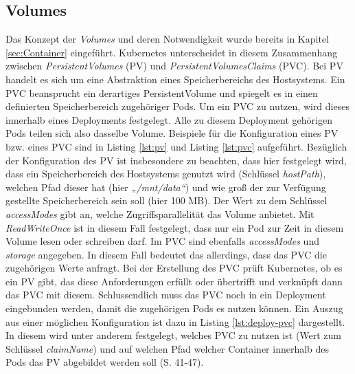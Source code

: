 \documentclass[11pt,a4paper]{article}
\begin{document}
\subsection{Volumes}
Das Konzept der \emph{Volumes} und deren Notwendigkeit wurde bereits in Kapitel \ref{sec:Container} eingeführt.
Kubernetes unterscheidet in diesem Zusammenhang zwischen \emph{PersistentVolumes} (PV) und \emph{PersistentVolumesClaims} (PVC).
Bei PV handelt es sich um eine Abstraktion eines Speicherbereichs des Hostsystems.
Ein PVC beansprucht ein derartiges PersistentVolume und spiegelt es in einen
definierten Speicherbereich zugehöriger Pods. Um ein PVC zu nutzen, wird dieses innerhalb eines Deployments festgelegt.
Alle zu diesem Deployment gehörigen Pods teilen sich also dasselbe Volume.
Beispiele für die Konfiguration eines PV bzw. eines PVC sind in Listing \ref{lst:pv} und Listing \ref{lst:pvc}
aufgeführt. Bezüglich der Konfiguration des PV ist insbesondere zu beachten, dass hier
festgelegt wird, dass ein Speicherbereich des Hostsystems genutzt wird (Schlüssel \emph{hostPath}),
welchen Pfad dieser hat (hier \emph{„/mnt/data“})
und wie groß der zur Verfügung gestellte Speicherbereich sein soll (hier 100 MB).
Der Wert zu dem Schlüssel \emph{accessModes} gibt an, welche Zugriffsparallelität das Volume anbietet.
Mit \emph{ReadWriteOnce} ist in diesem Fall festgelegt, dass nur ein Pod zur Zeit
in diesem Volume lesen oder schreiben darf.
Im PVC sind ebenfalls \emph{accessModes} und \emph{storage} angegeben. In diesem Fall
bedeutet das allerdings, dass das PVC die zugehörigen Werte anfragt.
Bei der Erstellung des PVC prüft Kubernetes, ob es ein PV gibt,
das diese Anforderungen erfüllt oder übertrifft und verknüpft dann das PVC mit diesem.
Schlussendlich muss das PVC noch in ein Deployment eingebunden werden, damit die zugehörigen
Pods es nutzen können. Ein Auszug aus einer möglichen Konfiguration ist dazu in
Listing \ref{lst:deploy-pvc} dargestellt. In diesem wird unter anderem festgelegt,
welches PVC zu nutzen ist (Wert zum Schlüssel \emph{claimName}) und auf welchen Pfad
welcher Container innerhalb des Pods das PV abgebildet werden soll \cite{Schmeling_Dargatz_2022} (S. 41-47).




\end{document}
